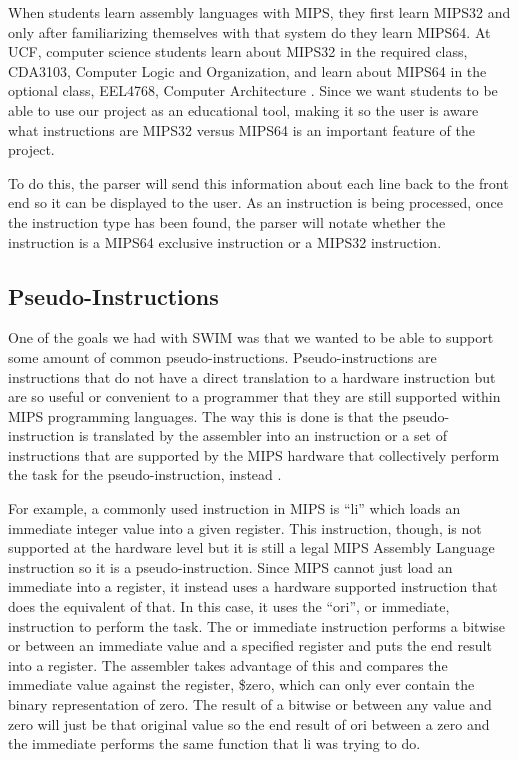 \documentclass[parskip=half, fontsize=12pt]{scrartcl}
\begin{document}
When students learn assembly languages with MIPS, they first learn
MIPS32 and only after familiarizing themselves with that system do they
learn MIPS64. At UCF, computer science students learn about MIPS32 in
the required class, CDA3103, Computer Logic and Organization, and learn
about MIPS64 in the optional class, EEL4768, Computer Architecture \cite{ucf-cs-electives}.
Since we want students to be able to use our project as an educational
tool, making it so the user is aware what instructions are MIPS32 versus
MIPS64 is an important feature of the project.

To do this, the parser will send this information about each line back
to the front end so it can be displayed to the user. As an instruction
is being processed, once the instruction type has been found, the parser
will notate whether the instruction is a MIPS64 exclusive instruction or
a MIPS32 instruction.

\subsection{Pseudo-Instructions}

One of the goals we had with SWIM was that we wanted to be able to
support some amount of common pseudo-instructions. Pseudo-instructions
are instructions that do not have a direct translation to a hardware
instruction but are so useful or convenient to a programmer that they
are still supported within MIPS programming languages. The way this is
done is that the pseudo-instruction is translated by the assembler into
an instruction or a set of instructions that are supported by the MIPS
hardware that collectively perform the task for the pseudo-instruction,
instead \cite{koehn-pseudoinstructions}.

For example, a commonly used instruction in MIPS is ``li'' which loads
an immediate integer value into a given register. This instruction,
though, is not supported at the hardware level but it is still a legal
MIPS Assembly Language instruction so it is a pseudo-instruction. Since
MIPS cannot just load an immediate into a register, it instead uses a
hardware supported instruction that does the equivalent of that. In this
case, it uses the ``ori'', or immediate, instruction to perform the
task. The or immediate instruction performs a bitwise or between an
immediate value and a specified register and puts the end result into a
register. The assembler takes advantage of this and compares the
immediate value against the register, \$zero, which can only ever
contain the binary representation of zero. The result of a bitwise or
between any value and zero will just be that original value so the end
result of ori between a zero and the immediate performs the same
function that li was trying to do.
\end{document}
